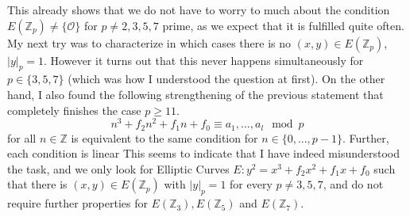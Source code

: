 \documentclass{scrartcl}
\newcommand{\Z}{\mathbb{Z}}
\renewcommand{\O}{\mathcal{O}}
\theoremstyle{definition}
\begin{document}
This already shows that we do not have to worry to much about the condition $E(\Z_p) \neq \{\O\}$ for $p \neq 2, 3, 5, 7$ prime, as we expect that it is fulfilled quite often.
My next try was to characterize in which cases there is no $(x, y) \in E(\Z_p)$, $|y|_p = 1$.
However it turns out that this never happens simultaneously for $p \in \{ 3, 5, 7 \}$ (which was how I understood the question at first).
On the other hand, I also found the following strengthening of the previous statement that completely finishes the case $p \geq 11$.
\begin{equation*}
    n^3 + f_2 n^2 + f_1 n + f_0 \equiv a_1, ..., a_l \mod p
\end{equation*}
for all $n \in \Z$ is equivalent to the same condition for $n \in \{ 0, ..., p - 1 \}$.
Further, each condition is linear
This seems to indicate that I have indeed misunderstood the task, and we only look for Elliptic Curves $E: y^2 = x^3 + f_2 x^2 + f_1 x + f_0$ such that there is $(x, y) \in E(\Z_p)$ with $|y|_p = 1$ for every $p \neq 3, 5, 7$, and do not require further properties for $E(\Z_3), E(\Z_5)$ and $E(\Z_7)$.
\end{document}
